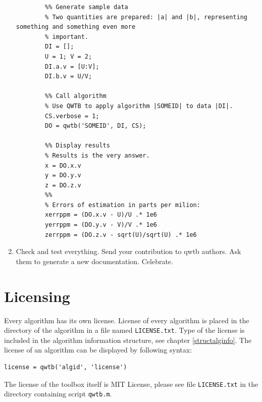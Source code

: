 \documentclass[12pt,a4paper,oneside]{report} %
\begin{document}
\begin{enumerate}
\begin{lstlisting}
        %% Generate sample data
        % Two quantities are prepared: |a| and |b|, representing something and something even more
        % important.
        DI = [];
        U = 1; V = 2;
        DI.a.v = [U:V];
        DI.b.v = U/V;

        %% Call algorithm
        % Use QWTB to apply algorithm |SOMEID| to data |DI|.
        CS.verbose = 1;
        DO = qwtb('SOMEID', DI, CS);

        %% Display results
        % Results is the very answer.
        x = DO.x.v
        y = DO.y.v
        z = DO.z.v
        %%
        % Errors of estimation in parts per milion:
        xerrppm = (DO.x.v - U)/U .* 1e6
        yerrppm = (DO.y.v - V)/V .* 1e6
        zerrppm = (DO.z.v - sqrt(U)/sqrt(U) .* 1e6
        \end{lstlisting} %

        \item Check and test everything. Send your contribution to qwtb authors. Ask them to
        generate a new documentation. Celebrate.

\end{enumerate}

\chapter{Licensing} %
\label{ch-license}
Every algorithm has its own license. License of every algorithm is placed in the directory of the
algorithm in a file named {\tt LICENSE.txt}. Type of the license is included in the algorithm information structure, see
chapter \ref{structalginfo}. The license of an algorithm can be displayed by following syntax:
\begin{lstlisting}
license = qwtb('algid', 'license')
\end{lstlisting}

The license of the toolbox itself is MIT License, please see file {\tt LICENSE.txt} in the directory
containing script {\tt qwtb.m}.

\printbibliography[title={Bilbiography},heading={bibnumbered}]
\end{document}
